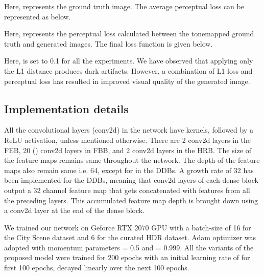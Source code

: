 \documentclass[conference]{IEEEtran}
\begin{document}
Here,  represents the ground truth image. The average perceptual loss  can be represented as below.

Here,  represents the perceptual loss calculated between the tonemapped ground truth and generated images.
The final loss function  is given below.

Here,  is set to 0.1 for all the experiments.
We have observed that applying only the L1 distance produces dark artifacts.
However, a combination of L1 loss and perceptual loss has resulted in improved visual quality of the generated image.

\subsection{Implementation details}

All the convolutional layers (conv2d) in the network have  kernels, followed by a ReLU activation, unless mentioned otherwise. There are 2 conv2d layers in the FEB, 20 () conv2d layers in FBB, and 2 conv2d layers in the HRB. The size of the feature maps remains same throughout the network. The depth of the feature maps also remain same i.e. 64, except for in the DDBs.
A growth rate of 32 has been implemented for the DDBs, meaning that  conv2d layers of each dense block output a 32 channel feature map that gets concatenated with features from all the preceding layers. This accumulated feature map depth is brought down using a  conv2d layer at the end of the dense block.

We trained our network on Geforce RTX 2070 GPU with a batch-size of 16 for the City Scene dataset and 6 for the curated HDR dataset. Adam optimizer \cite{kingma2014adam} was adopted with momentum parameters  = 0.5 and  = 0.999. All the variants of the proposed model were trained for 200 epochs with an initial learning rate of  for first 100 epochs, decayed linearly over the next 100 epochs. 
\end{document}
